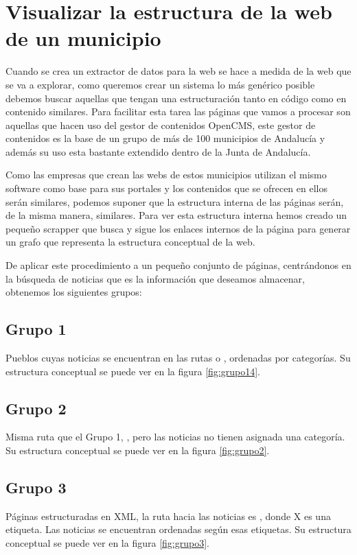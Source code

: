 
\section{Visualizar la estructura de la web de un municipio}

Cuando se crea un extractor de datos para la web se hace a medida de la web que se va a explorar, como queremos crear un sistema lo más genérico posible debemos buscar aquellas que tengan una estructuración tanto en código como en contenido similares. Para facilitar esta tarea las páginas que vamos a procesar son aquellas que hacen uso del gestor de contenidos OpenCMS, este gestor de contenidos es la base de un grupo de más de 100 municipios de Andalucía y además su uso esta bastante extendido dentro de la Junta de Andalucía.

Como las empresas que crean las webs de estos municipios utilizan el mismo software como base para sus portales y los contenidos que se ofrecen en ellos serán similares, podemos suponer que la estructura interna de las páginas serán, de la misma manera, similares. Para ver esta estructura interna hemos creado un pequeño scrapper que busca y sigue los enlaces internos de la página para generar un grafo que representa la estructura conceptual de la web.

De aplicar este procedimiento a un pequeño conjunto de páginas, centrándonos en la búsqueda de noticias que es la información que deseamos almacenar, obtenemos los siguientes grupos:

\subsection*{Grupo 1}
Pueblos cuyas noticias se encuentran en las rutas \textit{} o \textit{}, ordenadas por categorías. Su estructura conceptual se puede ver en la figura \ref{fig:grupo14}.
\subsection*{Grupo 2}
Misma ruta que el Grupo 1, \textit{}, pero las noticias no tienen asignada una categoría. Su estructura conceptual se puede ver en la figura \ref{fig:grupo2}.
\subsection*{Grupo 3}
Páginas estructuradas en XML, la ruta hacia las noticias es \textit{}, donde X es una etiqueta. Las noticias se encuentran ordenadas según esas etiquetas. Su estructura conceptual se puede ver en la figura \ref{fig:grupo3}.
